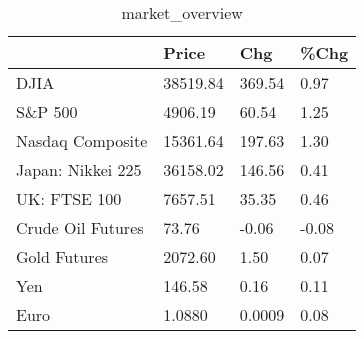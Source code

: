 \documentclass{article}%
\begin{document}
%


\begin{table}[htbp]%
\caption{market\_overview}%
\centering%
\begin{adjustbox}{width=1\textwidth}%
\begin{tabular}{llll}
\toprule
                  &    Price &    Chg &  \%Chg \\
\midrule
             DJIA & 38519.84 & 369.54 &  0.97 \\
          S\&P 500 &  4906.19 &  60.54 &  1.25 \\
 Nasdaq Composite & 15361.64 & 197.63 &  1.30 \\
Japan: Nikkei 225 & 36158.02 & 146.56 &  0.41 \\
     UK: FTSE 100 &  7657.51 &  35.35 &  0.46 \\
Crude Oil Futures &    73.76 &  -0.06 & -0.08 \\
     Gold Futures &  2072.60 &   1.50 &  0.07 \\
              Yen &   146.58 &   0.16 &  0.11 \\
             Euro &   1.0880 & 0.0009 &  0.08 \\
\bottomrule
\end{tabular}
%
\end{adjustbox}%
\end{table}

%
\end{document}
